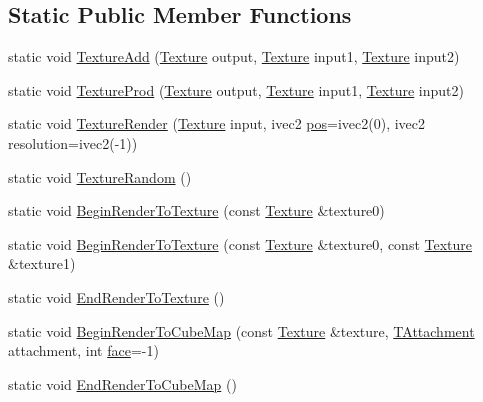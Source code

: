 \subsection*{Static Public Member Functions}
\begin{DoxyCompactItemize}
\item 
static void \hyperlink{class_agmd_1_1_texture_a12159c3ef9493e7a82879d8a727c4367}{Texture\+Add} (\hyperlink{class_agmd_1_1_texture}{Texture} output, \hyperlink{class_agmd_1_1_texture}{Texture} input1, \hyperlink{class_agmd_1_1_texture}{Texture} input2)
\item 
static void \hyperlink{class_agmd_1_1_texture_a0a6c56f3146829d69f1c0fe5a1bd790a}{Texture\+Prod} (\hyperlink{class_agmd_1_1_texture}{Texture} output, \hyperlink{class_agmd_1_1_texture}{Texture} input1, \hyperlink{class_agmd_1_1_texture}{Texture} input2)
\item 
static void \hyperlink{class_agmd_1_1_texture_af159d805c45dcb0d9fbcc5a1dc89954f}{Texture\+Render} (\hyperlink{class_agmd_1_1_texture}{Texture} input, ivec2 \hyperlink{_examples_2_planet_2_app_8cpp_aa8a1c0491559faca4ebd0881575ae7f0}{pos}=ivec2(0), ivec2 resolution=ivec2(-\/1))
\item 
static void \hyperlink{class_agmd_1_1_texture_a8947db62c7566c5cec617cf8f98cfce5}{Texture\+Random} ()
\item 
static void \hyperlink{class_agmd_1_1_texture_ad83edff18d06c385dbe996acc05d1d08}{Begin\+Render\+To\+Texture} (const \hyperlink{class_agmd_1_1_texture}{Texture} \&texture0)
\item 
static void \hyperlink{class_agmd_1_1_texture_af76ce235088ae359bb6b0973d7a209e4}{Begin\+Render\+To\+Texture} (const \hyperlink{class_agmd_1_1_texture}{Texture} \&texture0, const \hyperlink{class_agmd_1_1_texture}{Texture} \&texture1)
\item 
static void \hyperlink{class_agmd_1_1_texture_a9c4bd53f58f79ca3191b491ee152262a}{End\+Render\+To\+Texture} ()
\item 
static void \hyperlink{class_agmd_1_1_texture_a92ea7fe0b00e72d102f53544708ff2d1}{Begin\+Render\+To\+Cube\+Map} (const \hyperlink{class_agmd_1_1_texture}{Texture} \&texture, \hyperlink{namespace_agmd_abf15b6f1dac1ed4da398b83bda0408e2}{T\+Attachment} attachment, int \hyperlink{_planet_8cpp_ae1161f79bdbe47164b23549af2139d25}{face}=-\/1)
\item 
static void \hyperlink{class_agmd_1_1_texture_a81af676bea471fb4590eb2bccd567fba}{End\+Render\+To\+Cube\+Map} ()
\end{DoxyCompactItemize}
